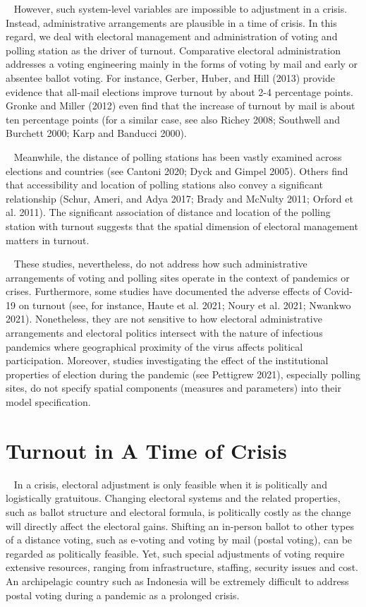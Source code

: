 \documentclass[
  12pt,
]{article}
\begin{document}
~ However, such system-level variables are impossible to adjustment in a
crisis. Instead, administrative arrangements are plausible in a time of
crisis. In this regard, we deal with electoral management and
administration of voting and polling station as the driver of turnout.
Comparative electoral administration addresses a voting engineering
mainly in the forms of voting by mail and early or absentee ballot
voting. For instance, Gerber, Huber, and Hill (2013) provide evidence
that all-mail elections improve turnout by about 2-4 percentage points.
Gronke and Miller (2012) even find that the increase of turnout by mail
is about ten percentage points (for a similar case, see also Richey
2008; Southwell and Burchett 2000; Karp and Banducci 2000).

~ Meanwhile, the distance of polling stations has been vastly examined
across elections and countries (see Cantoni 2020; Dyck and Gimpel 2005).
Others find that accessibility and location of polling stations also
convey a significant relationship (Schur, Ameri, and Adya 2017; Brady
and McNulty 2011; Orford et al. 2011). The significant association of
distance and location of the polling station with turnout suggests that
the spatial dimension of electoral management matters in turnout.

~ These studies, nevertheless, do not address how such administrative
arrangements of voting and polling sites operate in the context of
pandemics or crises. Furthermore, some studies have documented the
adverse effects of Covid-19 on turnout (see, for instance, Haute et al.
2021; Noury et al. 2021; Nwankwo 2021). Nonetheless, they are not
sensitive to how electoral administrative arrangements and electoral
politics intersect with the nature of infectious pandemics where
geographical proximity of the virus affects political participation.
Moreover, studies investigating the effect of the institutional
properties of election during the pandemic (see Pettigrew 2021),
especially polling sites, do not specify spatial components (measures
and parameters) into their model specification.

\hypertarget{turnout-in-a-time-of-crisis}{%
\section{Turnout in A Time of
Crisis}\label{turnout-in-a-time-of-crisis}}

~ In a crisis, electoral adjustment is only feasible when it is
politically and logistically gratuitous. Changing electoral systems and
the related properties, such as ballot structure and electoral formula,
is politically costly as the change will directly affect the electoral
gains. Shifting an in-person ballot to other types of a distance voting,
such as e-voting and voting by mail (postal voting), can be regarded as
politically feasible. Yet, such special adjustments of voting require
extensive resources, ranging from infrastructure, staffing, security
issues and cost. An archipelagic country such as Indonesia will be
extremely difficult to address postal voting during a pandemic as a
prolonged crisis.
\end{document}
